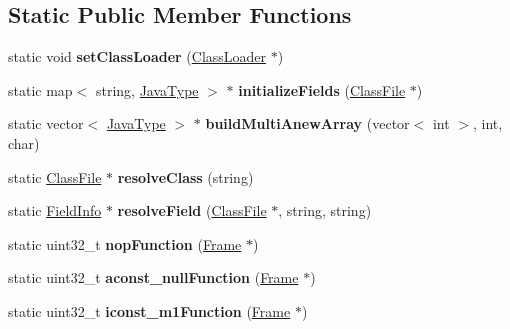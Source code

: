 \subsection*{Static Public Member Functions}
\begin{DoxyCompactItemize}
\item 
static void {\bfseries set\+Class\+Loader} (\hyperlink{classClassLoader}{Class\+Loader} $\ast$)\hypertarget{classInstruction_ae43b3c062c5fa3d20e8d0fdb588f440e}{}\label{classInstruction_ae43b3c062c5fa3d20e8d0fdb588f440e}

\item 
static map$<$ string, \hyperlink{structJavaType}{Java\+Type} $>$ $\ast$ {\bfseries initialize\+Fields} (\hyperlink{classClassFile}{Class\+File} $\ast$)\hypertarget{classInstruction_a65ca043d7540ccb9cc9dbf014bb324e8}{}\label{classInstruction_a65ca043d7540ccb9cc9dbf014bb324e8}

\item 
static vector$<$ \hyperlink{structJavaType}{Java\+Type} $>$ $\ast$ {\bfseries build\+Multi\+Anew\+Array} (vector$<$ int $>$, int, char)\hypertarget{classInstruction_a8e4b8b07ca5bb5e4fe7f20067b82cb5b}{}\label{classInstruction_a8e4b8b07ca5bb5e4fe7f20067b82cb5b}

\item 
static \hyperlink{classClassFile}{Class\+File} $\ast$ {\bfseries resolve\+Class} (string)\hypertarget{classInstruction_a8b0bc39eafe9e944256384e9e6819242}{}\label{classInstruction_a8b0bc39eafe9e944256384e9e6819242}

\item 
static \hyperlink{classFieldInfo}{Field\+Info} $\ast$ {\bfseries resolve\+Field} (\hyperlink{classClassFile}{Class\+File} $\ast$, string, string)\hypertarget{classInstruction_a0638fefe757efeaf7b6f2681f228899e}{}\label{classInstruction_a0638fefe757efeaf7b6f2681f228899e}

\item 
static uint32\+\_\+t {\bfseries nop\+Function} (\hyperlink{classFrame}{Frame} $\ast$)\hypertarget{classInstruction_a6f0c78ca85ceae1afe891aaf65d20add}{}\label{classInstruction_a6f0c78ca85ceae1afe891aaf65d20add}

\item 
static uint32\+\_\+t {\bfseries aconst\+\_\+null\+Function} (\hyperlink{classFrame}{Frame} $\ast$)\hypertarget{classInstruction_a6c043292e2f8252c1bf6f4f207ad411b}{}\label{classInstruction_a6c043292e2f8252c1bf6f4f207ad411b}

\item 
static uint32\+\_\+t {\bfseries iconst\+\_\+m1\+Function} (\hyperlink{classFrame}{Frame} $\ast$)\hypertarget{classInstruction_ae655faaa7e07e17ee09baf5c1994b5b7}{}\label{classInstruction_ae655faaa7e07e17ee09baf5c1994b5b7}


\end{DoxyCompactItemize}
